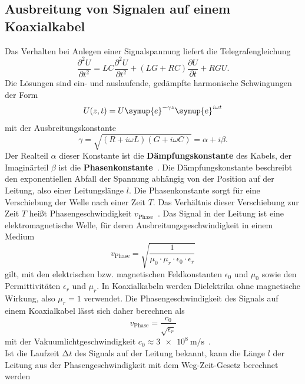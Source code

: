 \subsection{Ausbreitung von Signalen auf einem Koaxialkabel}
Das Verhalten bei Anlegen einer Signalspannung liefert die Telegrafengleichung
\begin{equation*}
    \frac{\partial^2U}{\partial t^2} = LC\frac{\partial^2U}{\partial t^2} + \left(LG + RC\right)\frac{\partial U}{\partial t} + RGU.
\end{equation*}
Die Lösungen sind ein- und auslaufende, gedämpfte harmonische Schwingungen der Form
\begin{equation}
    U(z,t)= U\symup{e}^{-\gamma z}\symup{e}^{i\omega t}
    \label{eqn:welle}
\end{equation}
mit der Ausbreitungskonstante
\begin{equation*}
    \gamma = \sqrt{\left(R+i\omega L\right)\left(G+i\omega C\right)} = \alpha + i\beta.
\end{equation*}
Der Realteil $\alpha$ dieser Konstante ist die \textbf{Dämpfungskonstante} des Kabels, der Imaginärteil $\beta$ ist die \textbf{Phasenkonstante}~\cite[1-2]{V52}.
Die Dämpfungskonstante beschreibt den exponentiellen Abfall der Spannung abhängig von der Position auf der Leitung, also einer Leitungslänge $l$.
Die Phasenkonstante sorgt für eine Verschiebung der Welle nach einer Zeit $T$.
Das Verhältnis dieser Verschiebung zur Zeit $T$ heißt Phasengeschwindigkeit $v_{\mathrm{Phase}}$~\cite[123]{beuth_2022}.
Das Signal in der Leitung ist eine elektromagnetische Welle, für deren Ausbreitungsgeschwindigkeit in einem Medium
\begin{equation*}
    v_{\mathrm{Phase}} = \sqrt{\frac{1}{\mu_0\cdot\mu_r\cdot\epsilon_0\cdot\epsilon_r}}
\end{equation*}
gilt, mit den elektrischen bzw. magnetischen Feldkonstanten $\epsilon_0$ und $\mu_0$ sowie den Permittivitäten $\epsilon_r$ und $\mu_r$.
In Koaxialkabeln werden Dielektrika ohne magnetische Wirkung, also $\mu_r = 1$ verwendet. 
Die Phasengeschwindigkeit des Signals auf einem Koaxialkabel lässt sich daher berechnen als
\begin{equation}
    v_{\mathrm{Phase}} = \frac{c_0}{\sqrt{\epsilon_r}}
    \label{eqn:phasengeschw}
\end{equation}
mit der Vakuumlichtgeschwindigkeit $c_0\approx\qty{3e8}{\meter\per\second}$~\cite[126 f.]{beuth_2022}.
\\
Ist die Laufzeit $\increment t$ des Signals auf der Leitung bekannt, kann die Länge $l$ der Leitung aus der Phasengeschwindigkeit mit dem Weg-Zeit-Gesetz berechnet werden
